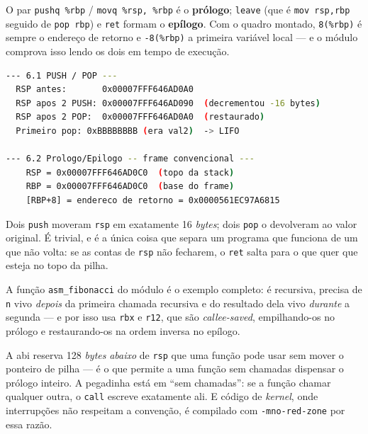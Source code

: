 O par \texttt{pushq \%rbp} / \texttt{movq \%rsp, \%rbp} é o \textbf{prólogo};
\texttt{leave} (que é \texttt{mov rsp,rbp} seguido de \texttt{pop rbp}) e
\texttt{ret} formam o \textbf{epílogo}. Com o quadro montado,
\texttt{8(\%rbp)} é sempre o endereço de retorno e \texttt{-8(\%rbp)} a
primeira variável local --- e o módulo comprova isso lendo os dois em tempo de
execução.

\begin{lstlisting}[style=bt, language=bash,
    caption={Saída medida de \texttt{dist/bin/asm\_06\_stack\_frames}.}]
--- 6.1 PUSH / POP ---
  RSP antes:       0x00007FFF646AD0A0
  RSP apos 2 PUSH: 0x00007FFF646AD090  (decrementou -16 bytes)
  RSP apos 2 POP:  0x00007FFF646AD0A0  (restaurado)
  Primeiro pop: 0xBBBBBBBB (era val2)  -> LIFO

--- 6.2 Prologo/Epilogo -- frame convencional ---
    RSP = 0x00007FFF646AD0C0  (topo da stack)
    RBP = 0x00007FFF646AD0C0  (base do frame)
    [RBP+8] = endereco de retorno = 0x0000561EC97A6815
\end{lstlisting}

Dois \texttt{push} moveram \texttt{rsp} em exatamente 16 \emph{bytes}; dois
\texttt{pop} o devolveram ao valor original. É trivial, e é a única coisa que
separa um programa que funciona de um que não volta: se as contas de
\texttt{rsp} não fecharem, o \texttt{ret} salta para o que quer que esteja no
topo da pilha.

A função \texttt{asm\_fibonacci} do módulo é o exemplo completo: é recursiva,
precisa de \texttt{n} vivo \emph{depois} da primeira chamada recursiva e do
resultado dela vivo \emph{durante} a segunda --- e por isso usa \texttt{rbx} e
\texttt{r12}, que são \emph{callee-saved}, empilhando-os no prólogo e
restaurando-os na ordem inversa no epílogo.

\begin{armadilha}
A \gls{abi} reserva 128 \emph{bytes} \emph{abaixo} de \texttt{rsp} que uma
função pode usar sem mover o ponteiro de pilha --- é o que permite a uma função
sem chamadas dispensar o prólogo inteiro. A pegadinha está em ``sem
chamadas'': se a função chamar qualquer outra, o \texttt{call} escreve
exatamente ali. E código de \emph{kernel}, onde interrupções não respeitam a
convenção, é compilado com \texttt{-mno-red-zone} por essa razão.
\end{armadilha}


